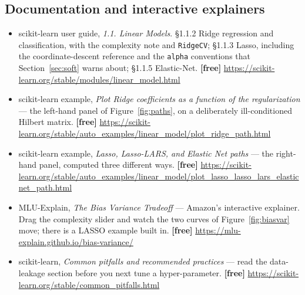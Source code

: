 \documentclass[11pt]{article}
\begin{document}
\subsection*{Documentation and interactive explainers}

\begin{itemize}[leftmargin=*]
  \item scikit-learn user guide, \emph{1.1. Linear Models}. \S1.1.2 Ridge
    regression and classification, with the complexity note and
    \texttt{RidgeCV}; \S1.1.3 Lasso, including the coordinate-descent
    reference and the \texttt{alpha} conventions that
    Section~\ref{sec:soft} warns about; \S1.1.5 Elastic-Net. \textbf{[free]}
    \url{https://scikit-learn.org/stable/modules/linear_model.html}
  \item scikit-learn example, \emph{Plot Ridge coefficients as a function of
    the regularization} --- the left-hand panel of
    Figure~\ref{fig:paths}, on a deliberately ill-conditioned Hilbert matrix.
    \textbf{[free]}
    \url{https://scikit-learn.org/stable/auto_examples/linear_model/plot_ridge_path.html}
  \item scikit-learn example, \emph{Lasso, Lasso-LARS, and Elastic Net paths}
    --- the right-hand panel, computed three different ways.
    \textbf{[free]}
    \url{https://scikit-learn.org/stable/auto_examples/linear_model/plot_lasso_lasso_lars_elasticnet_path.html}
  \item MLU-Explain, \emph{The Bias Variance Tradeoff} --- Amazon's
    interactive explainer. Drag the complexity slider and watch the two curves
    of Figure~\ref{fig:biasvar} move; there is a LASSO example built in.
    \textbf{[free]} \url{https://mlu-explain.github.io/bias-variance/}
  \item scikit-learn, \emph{Common pitfalls and recommended practices} ---
    read the data-leakage section before you next tune a hyper-parameter.
    \textbf{[free]} \url{https://scikit-learn.org/stable/common_pitfalls.html}
\end{itemize}

\enlargethispage{4\baselineskip}
\notesources{\AMLUnitVSources}
\end{document}
